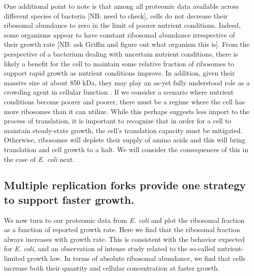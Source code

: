 One additional point to note is that among all proteomic data available across
different species of bacteria [NB: need to check], cells do not decrease their
ribosomal abundance to zero in the limit of poorer nutrient conditions. Indeed,
some organisms appear to have constant ribosomal abundance irrespective of their
growth rate [NB: ask Griffin and figure out what organism this is]. From the
perspective of a bacterium dealing with uncertain nutrient conditions, there is
likely a benefit for the cell to maintain some relative fraction of ribosomes to
support rapid growth as nutrient conditions improve. In addition, given their
massive size at about 850 kDa, they may play an as-yet fully understood role as
a crowding agent in cellular function \cite{delarue2018, solerbistue2020}. If we
consider a scenario where nutrient conditions become poorer and poorer, there
must be a regime where the cell has more ribosomes than it can utilize. While
this perhaps suggests less import to the  process of translation, it is
important to recognize that in order for a cell to maintain steady-state growth,
the cell's translation capacity must be mitigated. Otherwise, ribosomes will
deplete their supply of amino acids and this will bring translation and cell
growth to a halt. We will consider the consequences of this in the case of \textit{E. coli} next.


\subsection{Multiple replication forks provide one strategy to support faster growth.}


We now turn to our proteomic data from \textit{E. coli} and plot the ribosomal
fraction as a function of reported growth rate. Here we find that the ribosomal
fraction always increases with growth rate. This is consistent with the behavior
expected for \textit{E. coli}, and an observation of intense study related to
the so-called nutrient-limited growth law. In terms of absolute ribosomal
abundance, we find that cells increase both their quantity and cellular
concentration at faster growth.

